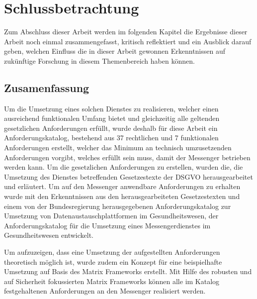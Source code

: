 \chapter{Schlussbetrachtung}\label{chapter:schlussbetrachtung}
Zum Abschluss dieser Arbeit werden im folgenden Kapitel die Ergebnisse dieser Arbeit noch einmal zusammengefasst, kritisch reflektiert und ein Ausblick darauf geben, welchen Einfluss die in dieser Arbeit gewonnen Erkenntnissen auf zukünftige Forschung in diesem Themenbereich haben können.

\section{Zusamenfassung}\label{chapter:kr}

Um die Umsetzung eines solchen Dienstes zu realisieren, welcher einen ausreichend funktionalen Umfang bietet und gleichzeitig alle geltenden gesetzlichen Anforderungen erfüllt, wurde deshalb für diese Arbeit ein Anforderungskatalog, bestehend aus 37 rechtlichen und 7 funktionalen Anforderungen erstellt, welcher das Minimum an technisch umzusetzenden Anforderungen vorgibt, welches erfüllt sein muss, damit der Messenger betrieben werden kann. Um die gesetzlichen Anforderungen zu erstellen, wurden die, die Umsetzung des Dienstes betreffenden Gesetzestexte der DSGVO herausgearbeitet und erläutert. Um auf den Messenger anwendbare Anforderungen zu erhalten wurde mit den Erkenntnissen aus den herausgearbeiteten Gesetzestexten und einem von der Bundesregierung herausgegebenen Anforderungskatalog zur Umsetzung von Datenaustauschplattformen im Gesundheitswesen, der Anforderungskatalog für die Umsetzung eines Messengerdienstes im Gesundheitswesen entwickelt.

Um aufzuzeigen, dass eine Umsetzung der aufgestellten Anforderungen theoretisch möglich ist, wurde zudem ein Konzept für eine beispielhafte Umsetzung auf Basis des Matrix Frameworks erstellt. Mit Hilfe des robusten und auf Sicherheit fokussierten Matrix Frameworks können alle im Katalog festgehaltenen Anforderungen an den Messenger realisiert werden. 

